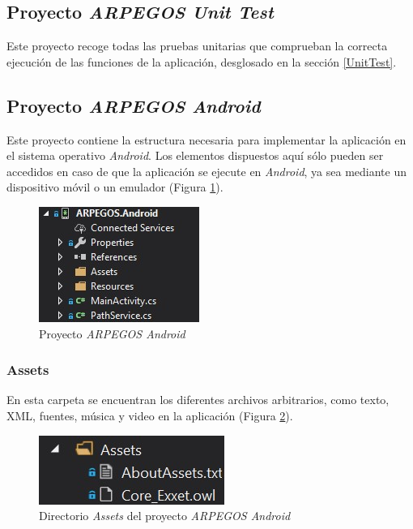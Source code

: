 {\subsection{Proyecto \textit{ARPEGOS Unit Test}}
Este proyecto recoge todas las pruebas unitarias que comprueban la correcta ejecución de las funciones de la aplicación,
desglosado en la sección \ref*{UnitTest}.

\subsection{Proyecto \textit{ARPEGOS Android}}
Este proyecto contiene la estructura necesaria para implementar la aplicación en el sistema operativo \textit{Android}. Los 
elementos dispuestos aquí sólo pueden ser accedidos en caso de que la aplicación se ejecute en \textit{Android}, ya sea 
mediante un dispositivo móvil o un emulador (Figura \ref*{ARPEGOSAndroid}).

\begin{figure}[H]
    \centering
    \includegraphics[scale=1.5]{Images/ARPEGOS_Android.jpg}
    \caption{Proyecto \textit{ARPEGOS Android}}
    \label{ARPEGOSAndroid}    
\end{figure}

\subsubsection{Assets}
En esta carpeta se encuentran los diferentes archivos arbitrarios, como texto, XML, fuentes, música y video en la 
aplicación (Figura \ref*{AssetsAndroid}).

\begin{figure}[H]
    \centering
    \includegraphics[scale=1.5]{Images/ARPEGOS_Android_Assets.jpg}
    \caption{Directorio \textit{Assets} del proyecto \textit{ARPEGOS Android}}
    \label{AssetsAndroid}    
\end{figure}

}
